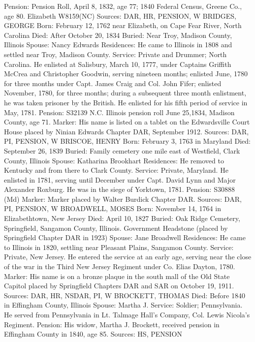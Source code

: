 Pension: Pension Roll, April 8, 1832, age 77; 1840 Federal Census, Greene Co., age 80. Elizabeth W8159(NC) 
Sources: DAR, HR, PENSION, W 
BRIDGES, GEORGE 
Born: February 12, 1762 near Elizabeth, on Cape Fear River, North Carolina 
Died: After October 20, 1834 
Buried: Near Troy, Madison County, Illinois 
Spouse: Nancy Edwards 
Residences: He came to Illinois in 1808 and settled near Troy, Madison County. 
Service: Private and Drummer; North Carolina. He enlisted at Salisbury, March 10, 1777, under Captains Griffith McCrea and Christopher Goodwin, serving nineteen months; enlisted June, 1780 for three months under Capt. James Craig and Col. John Fifer; enlisted November, 1780, for three months; during a subsequent three month enlistment, he was taken prisoner by the British. He enlisted for his fifth period of service in May, 1781. 
Pension: S32139 N.C. Illinois pension roll June 25,1834, Madison County, age 71. Marker: His name is listed on a tablet on the Edwardsville Court House placed by Ninian Edwards Chapter DAR, September 1912. 
Sources: DAR, PI, PENSION, W 
BRISCOE, HENRY 
Born: February 3, 1763 in Maryland 
Died: September 26, 1839 
Buried: Family cemetery one mile east of Westfield, Clark County, Illinois Spouse: Katharina Brookhart 
Residences: He removed to Kentucky and from there to Clark County. 
Service: Private, Maryland. He enlisted in 1781, serving until December under Capt. David Lynn and Major Alexander Roxburg. He was in the siege of Yorktown, 1781. 
Pension: S30888 (Md) Marker: 
Marker placed by Walter Burdick Chapter DAR. 
Sources: DAR, PI, PENSION, W 
BROADWELL, MOSES 
Born: November 14, 1764 in Elizabethtown, New Jersey 
Died: April 10, 1827 
Buried: Oak Ridge Cemetery, Springfield, Sangamon County, Illinois. Government 
Headstone (placed by Springfield Chapter DAR in 1923) Spouse: Jane Broadwell 
Residences: He came to Illinois in 1820, settling near Pleasant Plains, Sangamon County. 
Service: Private, New Jersey. He entered the service at an early age, serving near the close of the war in the Third New Jersey Regiment under Co. Elias Dayton, 1780. 
Marker: His name is on a bronze plaque in the south mall of the Old State Capitol placed by Springfield Chapters DAR and SAR on October 19, 1911. 
Sources: DAR, HR, NSDAR, PI, W 
BROCKETT, THOMAS 
Died: Before 1840 in Effingham County, Illinois 
Spouse: Martha J. 
Service: Soldier; Pennsylvania. He served from Pennsylvania in Lt. Talmage Hall's Company, Col. Lewis Nicola's Regiment. 
Pension: His widow, Martha J. Brockett, received pension in Effingham County in 1840, age 85. 
Sources: HS, PENSION 
